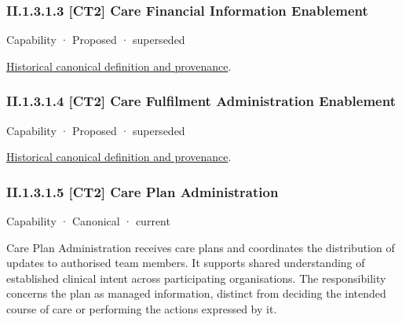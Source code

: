 \subsubsection*{II.1.3.1.3 [CT2] Care Financial Information Enablement}
\label{navigation:II.1.3.1.3}

\label{element:59a756b89c604e3e97ee5dede2d6ed89}
{\small Capability · Proposed · superseded}\par
\href{../../../../continuum/strategy/capability/59a756b89c604e3e97ee5dede2d6ed89.md}{Historical canonical definition and provenance}.\par
\subsubsection*{II.1.3.1.4 [CT2] Care Fulfilment Administration Enablement}
\label{navigation:II.1.3.1.4}

\label{element:9f0f4379c1954524ba5e691d0c7d95ab}
{\small Capability · Proposed · superseded}\par
\href{../../../../continuum/strategy/capability/9f0f4379c1954524ba5e691d0c7d95ab.md}{Historical canonical definition and provenance}.\par
\subsubsection*{II.1.3.1.5 [CT2] Care Plan Administration}
\label{navigation:II.1.3.1.5}

\label{element:cf06eec5699f406fa30a00d2f76e3098}
{\small Capability · Canonical · current}\par

Care Plan Administration receives care plans and coordinates the distribution of updates to authorised team members. It supports shared understanding of established clinical intent across participating organisations. The responsibility concerns the plan as managed information, distinct from deciding the intended course of care or performing the actions expressed by it.



